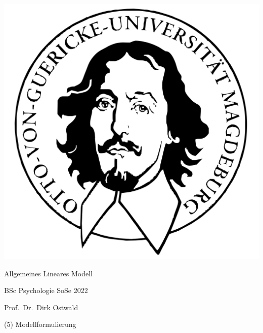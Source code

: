 \documentclass[
  8pt,
  ignorenonframetext,
]{beamer}
\author{}
\date{\vspace{-2.5em}}
\begin{document}
\begin{frame}[plain]{}
\protect\hypertarget{section}{}
\center

\begin{center}\includegraphics[width=0.2\linewidth]{5_Abbildungen/alm_5_otto} \end{center}

\vspace{2mm}

\huge

Allgemeines Lineares Modell \vspace{6mm}

\large

BSc Psychologie SoSe 2022

\vspace{6mm}
\normalsize

Prof.~Dr.~Dirk Ostwald
\end{frame}

\begin{frame}[plain]{}
\protect\hypertarget{section-1}{}
\center
\huge
\vfill

\noindent (5) Modellformulierung \vfill
\end{frame}
\end{document}
